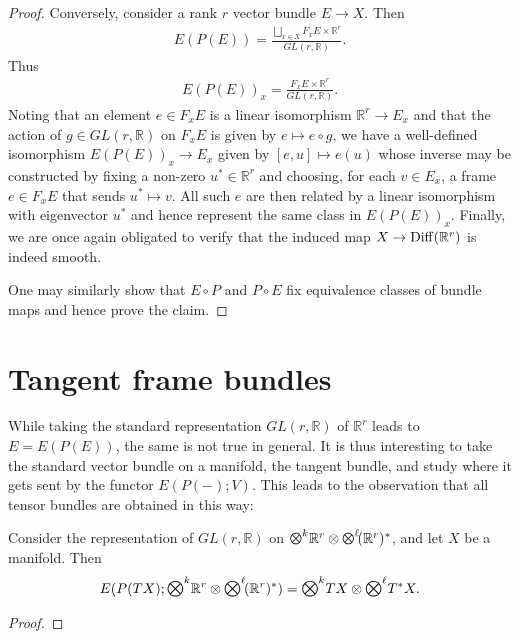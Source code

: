 \documentclass{article}
\begin{document}
\begin{theorem}
\begin{proof}
    Conversely, consider a rank $r$ vector bundle $E\to X$. Then
    \begin{align*}
      E(P(E)) = \frac{\bigsqcup_{x\in X} F_x E \times\mathbb{R}^r}{GL(r,\mathbb{R})}.
    \end{align*}
    Thus
    \begin{align*}
      E(P(E))_x = \frac{F_x E\times\mathbb{R}^r}{GL(r,\mathbb{R})}.
    \end{align*}
    Noting that an element $e\in F_x E$ is a linear isomorphism
    $\mathbb{R}^r\to E_x$ and that the action of $g\in GL(r,\mathbb{R})$
    on $F_x E$ is given by $e\mapsto e\circ g$,
    we have a well-defined isomorphism $E(P(E))_x\to E_x$ given by
    $[e,u]\mapsto e(u)$ whose inverse may be constructed by fixing
    a non-zero $u^*\in\mathbb{R}^r$ and choosing,
    for each $v\in E_x$, a frame $e\in F_x E$ that sends
    $u^*\mapsto v$. All such $e$ are then related by a linear isomorphism
    with eigenvector $u^*$ and hence represent the same class in
    $E(P(E))_x$. Finally, we are once again obligated to verify that
    the induced map $X\to\operatorname{Diff}(\mathbb{R}^r)$ is indeed smooth.

    One may similarly show that $E\circ P$ and $P\circ E$ fix equivalence
    classes of bundle maps and hence prove the claim.
  \end{proof}
\end{theorem}

\section{Tangent frame bundles}

While taking the standard representation $GL(r,\mathbb{R})$
of $\mathbb{R}^r$ leads to $E=E(P(E))$, the same is not true in general.
It is thus interesting to take the standard vector bundle on a manifold,
the tangent bundle, and study where it gets sent by the functor $E(P(-); V)$.
This leads to the observation that all tensor bundles
are obtained in this way:

\begin{theorem}
  Consider the representation of $GL(r,\mathbb{R})$ on
  $\tensor{k}{\mathbb{R}}^r\otimes\tensor{\ell}{(\mathbb{R}^r)^*}$,
  and let $X$ be a manifold. Then
  \begin{align*}
    E(P(TX);\tensor{k}{\mathbb{R}}^r\otimes\tensor{\ell}{(\mathbb{R}^r)^*}) = \tensor{k}{TX}\otimes\tensor{\ell}{T^*X}.
  \end{align*}
  \begin{proof}
    \missingproof
  \end{proof}
\end{theorem}
\end{document}
